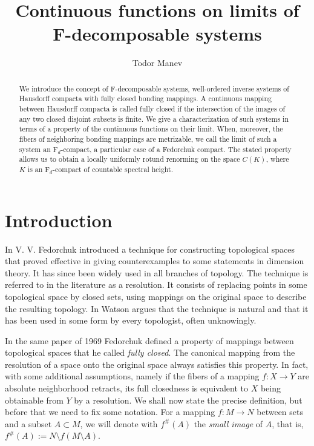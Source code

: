 \documentclass[11pt]{article}
\title{Continuous functions on limits of F-decomposable systems}
\author{Todor Manev}
\date{}
\theoremstyle{definition}
\theoremstyle{remark}
\begin{document}
\maketitle

\begin{abstract}
	We introduce the concept of F-decomposable systems, well-ordered inverse systems of Hausdorff compacta with fully closed bonding mappings. A continuous mapping between Hausdorff compacta is called fully closed if the intersection of the images of any two closed disjoint subsets is finite. We give a characterization of such systems in terms of a property of the continuous functions on their limit. When, moreover, the fibers of neighboring bonding mappings are metrizable, we call the limit of such a system an $\mathrm{F}_d$-compact, a particular case of a Fedorchuk compact. The stated property allows us to obtain a locally uniformly rotund renorming on the space $C(K)$, where $K$ is an $\mathrm{F}_d$-compact of countable spectral height.
\end{abstract}

	
\setlength{\abovedisplayskip}{4pt}
\setlength{\belowdisplayskip}{4pt}

\section{Introduction}

In \cite{fed69} V. V. Fedorchuk introduced a technique for constructing topological spaces that proved effective in giving counterexamples to some statements in dimension theory. It has since been widely used in all branches of topology. The technique is referred to in the literature as a resolution. It consists of replacing points in some topological space by closed sets, using mappings on the original space to describe the resulting topology. In \cite{watson} Watson argues that the technique is natural and that it has been used in some form by every topologist, often unknowingly.

In the same paper of 1969 Fedorchuk defined a property of mappings between topological spaces that he called \emph{fully closed}. The canonical mapping from the resolution of a space onto the original space always satisfies this property. In fact, with some additional assumptions, namely if the fibers of a mapping $f: X \to Y$ are absolute neighborhood retracts, its full closedness is equivalent to $X$ being obtainable from $Y$ by a resolution. We shall now state the precise definition, but before that we need to fix some notation. For a mapping $f:M \to N$ between sets and a subset $A \subset M$, we will denote with $f^\#(A)$ the \textit{small image} of $A$, that is, $f^\#(A) := N \setminus f(M \setminus A)$.
\end{document}

